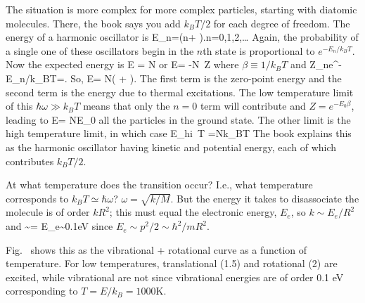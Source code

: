 \documentclass[11pt]{book}
\begin{document}
The situation is more complex for more complex particles, starting with diatomic molecules. There, the book says you add $k_BT/2$ for each degree of freedom. 
The energy of a harmonic oscillator is
\be
E_n=\hbar \omega\left(n+ \right).\qquad n=0,1,2,\ldots\ee
Again, the probability of a single one of these oscillators begin in the $n$th state is proportional to $e^{-E_n/k_BT}$. Now the expected energy is
\be
\langle E\rangle
= N
\ee
or
\be
\langle E\rangle = -N\frac{\partial}{\partial\beta} \,\ln Z
\ee
where $\beta\equiv 1/k_BT$ and
\be
Z\equiv \sum_ne^{-E_n/k_BT}=.\ee
So,
\be
\langle E\rangle = N\left(  +  \right).\ee
The first term is the zero-point energy and the second term is the energy due to thermal excitations.
The low temperature limit of this $\hbar\omega \gg k_BT$ means that only the $n=0$ term will contribute and $Z=e^{-E_0\beta}$, leading to
\be
\langle E\rangle = NE_0\ee
all the particles in the ground state. The other limit is the high temperature limit, in which case \be
\langle E\rangle_{hi\, T} =Nk_BT\ee
The book explains this as the harmonic oscillator having kinetic and potential energy, each of which contributes $k_BT/2$.

At what temperature does the transition occur? I.e., what temperature corresponds to $k_BT\simeq \hbar\omega$?
$\omega= \sqrt{k/M}$. But the energy it takes to disassociate the molecule is of order $kR^2$; this must equal the electronic energy, $E_e$, so $k\sim E_e/R^2$ and
\be
\hbar\omega \sim {}= E_e\sim 0.1eV\ee
since $E_e\sim p^2/2 \sim\hbar^2/mR^2$.

Fig.~ shows this as the vibrational + rotational curve as a function of temperature. For low temperatures, translational (1.5) and rotational (2) are excited, while vibrational are not since vibrational energies are of order 0.1 eV corresponding to $T=E/k_B=1000$K.

\end{document}
